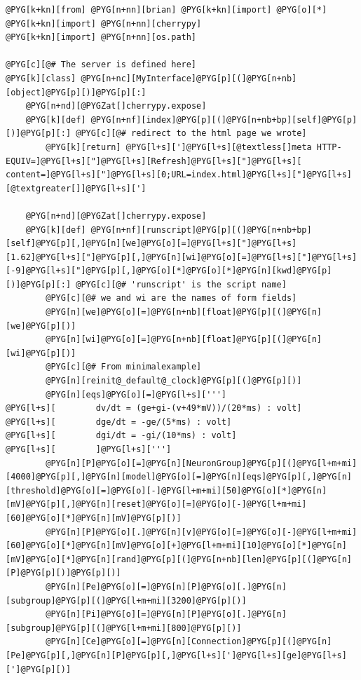 \documentclass[letterpaper,10pt,english]{manual}
\begin{document}
\begin{Verbatim}[commandchars=@\[\]]
@PYG[k+kn][from] @PYG[n+nn][brian] @PYG[k+kn][import] @PYG[o][*]
@PYG[k+kn][import] @PYG[n+nn][cherrypy]
@PYG[k+kn][import] @PYG[n+nn][os.path]

@PYG[c][@# The server is defined here]
@PYG[k][class] @PYG[n+nc][MyInterface]@PYG[p][(]@PYG[n+nb][object]@PYG[p][)]@PYG[p][:]
    @PYG[n+nd][@PYGZat[]cherrypy.expose]
    @PYG[k][def] @PYG[n+nf][index]@PYG[p][(]@PYG[n+nb+bp][self]@PYG[p][)]@PYG[p][:] @PYG[c][@# redirect to the html page we wrote]
        @PYG[k][return] @PYG[l+s][']@PYG[l+s][@textless[]meta HTTP-EQUIV=]@PYG[l+s]["]@PYG[l+s][Refresh]@PYG[l+s]["]@PYG[l+s][ content=]@PYG[l+s]["]@PYG[l+s][0;URL=index.html]@PYG[l+s]["]@PYG[l+s][@textgreater[]]@PYG[l+s][']

    @PYG[n+nd][@PYGZat[]cherrypy.expose]
    @PYG[k][def] @PYG[n+nf][runscript]@PYG[p][(]@PYG[n+nb+bp][self]@PYG[p][,]@PYG[n][we]@PYG[o][=]@PYG[l+s]["]@PYG[l+s][1.62]@PYG[l+s]["]@PYG[p][,]@PYG[n][wi]@PYG[o][=]@PYG[l+s]["]@PYG[l+s][-9]@PYG[l+s]["]@PYG[p][,]@PYG[o][*]@PYG[o][*]@PYG[n][kwd]@PYG[p][)]@PYG[p][:] @PYG[c][@# 'runscript' is the script name]
        @PYG[c][@# we and wi are the names of form fields]
        @PYG[n][we]@PYG[o][=]@PYG[n+nb][float]@PYG[p][(]@PYG[n][we]@PYG[p][)]
        @PYG[n][wi]@PYG[o][=]@PYG[n+nb][float]@PYG[p][(]@PYG[n][wi]@PYG[p][)]
        @PYG[c][@# From minimalexample]
        @PYG[n][reinit@_default@_clock]@PYG[p][(]@PYG[p][)]
        @PYG[n][eqs]@PYG[o][=]@PYG[l+s][''']
@PYG[l+s][        dv/dt = (ge+gi-(v+49*mV))/(20*ms) : volt]
@PYG[l+s][        dge/dt = -ge/(5*ms) : volt]
@PYG[l+s][        dgi/dt = -gi/(10*ms) : volt]
@PYG[l+s][        ]@PYG[l+s][''']
        @PYG[n][P]@PYG[o][=]@PYG[n][NeuronGroup]@PYG[p][(]@PYG[l+m+mi][4000]@PYG[p][,]@PYG[n][model]@PYG[o][=]@PYG[n][eqs]@PYG[p][,]@PYG[n][threshold]@PYG[o][=]@PYG[o][-]@PYG[l+m+mi][50]@PYG[o][*]@PYG[n][mV]@PYG[p][,]@PYG[n][reset]@PYG[o][=]@PYG[o][-]@PYG[l+m+mi][60]@PYG[o][*]@PYG[n][mV]@PYG[p][)]
        @PYG[n][P]@PYG[o][.]@PYG[n][v]@PYG[o][=]@PYG[o][-]@PYG[l+m+mi][60]@PYG[o][*]@PYG[n][mV]@PYG[o][+]@PYG[l+m+mi][10]@PYG[o][*]@PYG[n][mV]@PYG[o][*]@PYG[n][rand]@PYG[p][(]@PYG[n+nb][len]@PYG[p][(]@PYG[n][P]@PYG[p][)]@PYG[p][)]
        @PYG[n][Pe]@PYG[o][=]@PYG[n][P]@PYG[o][.]@PYG[n][subgroup]@PYG[p][(]@PYG[l+m+mi][3200]@PYG[p][)]
        @PYG[n][Pi]@PYG[o][=]@PYG[n][P]@PYG[o][.]@PYG[n][subgroup]@PYG[p][(]@PYG[l+m+mi][800]@PYG[p][)]
        @PYG[n][Ce]@PYG[o][=]@PYG[n][Connection]@PYG[p][(]@PYG[n][Pe]@PYG[p][,]@PYG[n][P]@PYG[p][,]@PYG[l+s][']@PYG[l+s][ge]@PYG[l+s][']@PYG[p][)]

\end{Verbatim}
\end{document}
